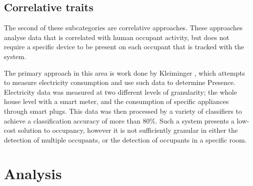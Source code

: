 \documentclass[../thesis/thesis.tex]{subfiles}
\begin{document}
\subsection{Correlative traits}
\label{subsubsec:litreview:sensors:extrinsic:correlative}
The second of these subcategories are correlative approaches. These approaches analyse data that is correlated with human occupant activity, but does not require a specific device to be present on each occupant that is tracked with the system.

The primary approach in this area is work done by Kleiminger \etal \cite{kleiminger2013occupancy}, which attempts to measure electricity consumption and use such data to determine Presence. Electricity data was measured at two different levels of granularity; the whole house level with a smart meter, and the consumption of specific appliances through smart plugs. This data was then processed by a variety of classifiers to achieve a classification accuracy of more than 80\%. Such a system presents a low-cost solution to occupancy, however it is not sufficiently granular in either the detection of multiple occupants, or the detection of occupants in a specific room.

\section{Analysis}
\label{subsec:litreview:sensors:analysis}
\end{document}
